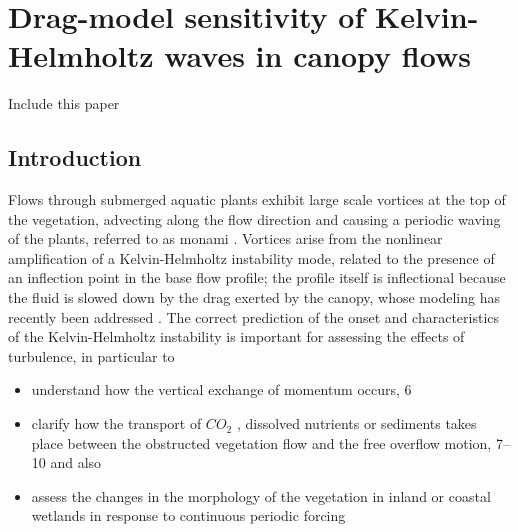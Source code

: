\chapter{Drag-model sensitivity of Kelvin-Helmholtz waves in canopy flows}
\label{ch:stability}


\citet{segura2017permeable} 

Include this paper \citet{sharma2017stabilitycanopy}

\section{Introduction}




Flows through submerged aquatic plants exhibit large scale vortices at the top of the vegetation,
advecting along the flow direction and causing a periodic waving of the plants, referred to as
monami \cite{ackerman1993reduced}.  Vortices arise from the nonlinear amplification of a Kelvin-Helmholtz instability mode,
related to the presence of an inflection point in the base flow profile; \cite{asaeda2005morphological} the profile itself is inflectional
because the fluid is slowed down by the drag exerted by the canopy, whose modeling has recently
been addressed \cite{py2004mixing} \cite{singh2016linear}  \cite{zampogna2016instability}. The correct prediction of the onset and characteristics of the Kelvin-Helmholtz
instability is important for assessing the effects of turbulence, in particular to
\begin{itemize}
	\item  understand how the vertical exchange of momentum occurs, 6
	\item clarify how the transport of $CO_2$ , dissolved nutrients or sediments takes place between the
	obstructed vegetation flow and the free overflow motion, 7–10 and also
	\item assess the changes in the morphology of the vegetation in inland or coastal wetlands in
	response to continuous periodic forcing \cite{asaeda2005morphological} \cite{patil2010characteristics}
\end{itemize}

